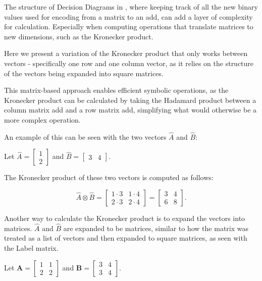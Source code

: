 The structure of Decision Diagrams in \Cupaal, where keeping track of all the new binary values used for encoding from a matrix to an \gls{add}, can add a layer of complexity for calculation.
Especially when computing operations that translate matrices to new dimensions, such as the Kronecker product.

Here we present a variation of the Kronecker product that only works between vectors - specifically one row and one column vector, as it relies on the structure of the vectors being expanded into square matrices.

This matrix-based approach enables efficient symbolic operations, as the Kronecker product can be calculated by taking the Hadamard product between a column matrix \gls{add} and a row matrix \gls{add}, simplifying what would otherwise be a more complex operation.

An example of this can be seen with the two vectors $\hat{A}$ and $\hat{B}$:

Let $\hat{A} = \begin{bmatrix}
        1 \\
        2
    \end{bmatrix}$
and $\hat{B}=\begin{bmatrix}
        3 & 4
    \end{bmatrix}$.

The Kronecker product of these two vectors is computed as follows:

\begin{equation}
    \hat{A} \otimes \hat{B} = \begin{bmatrix}
        1 \cdot 3 & 1 \cdot 4 \\
        2 \cdot 3 & 2 \cdot 4
    \end{bmatrix} = \begin{bmatrix}
        3 & 4 \\
        6 & 8
    \end{bmatrix}.
    \label{eq:kronecker-product-example}
\end{equation}

Another way to calculate the Kronecker product is to expand the vectors into matrices.
$\hat{A}$ and $\hat{B}$ are expanded to be matrices, similar to how the matrix was treated as a list of vectors and then expanded to square matrices, as seen with the Label matrix.

Let $\mathbf{A} = \begin{bmatrix}
        1 & 1 \\
        2 & 2
    \end{bmatrix}$ and
$\mathbf{B} = \begin{bmatrix}
        3 & 4 \\
        3 & 4
    \end{bmatrix}$.

